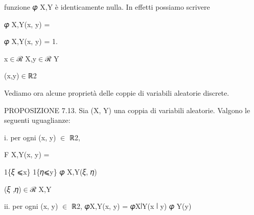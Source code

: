 \documentclass[a4paper,portrait,12pt]{article}
\begin{document}
\begin{flushleft}
funzione 𝜑 X,Y \`{e} identicamente nulla. In effetti possiamo scrivere
\end{flushleft}


\begin{flushleft}
𝜑 X,Y(x, y) =
\end{flushleft}





\begin{flushleft}
𝜑 X,Y(x, y) = 1.
\end{flushleft}


\begin{flushleft}
x$\in$ℛ X,y$\in$ℛ Y
\end{flushleft}





\begin{flushleft}
(x,y)$\in$ℝ2
\end{flushleft}





\begin{flushleft}
Vediamo ora alcune propriet\`{a} delle coppie di variabili aleatorie discrete.
\end{flushleft}


\begin{flushleft}
PROPOSIZIONE 7.13. Sia (X, Y) una coppia di variabili aleatorie. Valgono le seguenti uguaglianze:
\end{flushleft}


\begin{flushleft}
i. per ogni (x, y) $\in$ ℝ2,
\end{flushleft}


\begin{flushleft}
F X,Y(x, y) =
\end{flushleft}





\begin{flushleft}
1\{𝜉 ⩽x\} 1\{𝜂⩽y\} 𝜑 X,Y(𝜉, 𝜂)
\end{flushleft}


\begin{flushleft}
(𝜉 ,𝜂)$\in$ℛ X,Y
\end{flushleft}





\begin{flushleft}
ii. per ogni (x, y) $\in$ ℝ2, 𝜑X,Y(x, y) = 𝜑X∣Y(x ∣ y) 𝜑 Y(y)
\end{flushleft}
\end{document}
